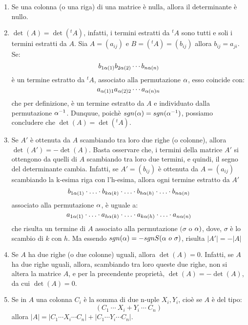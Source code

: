 \documentclass[../main.tex]{subfiles}
\begin{document}
\begin{enumerate}
    \item Se una colonna (o una riga) di una matrice è nulla, allora il determinante è
          nullo.
    \item $\det(A) = \det({^{t}A})$, infatti, i termini estratti da ${^{t}A}$ sono tutti e soli i termini estratti da $A$. Sia $A= (a_{ij})$ e $B = ({^{t}A}) = (b_{ij})$ allora $b_{ij} = a_{ji}$. Se:
          \[
              b_{1\alpha(1)}b_{2\alpha(2)}\cdots b_{n\alpha(n)}
          \]
          è un termine estratto da ${^{t}A}$, associato alla permutazione $\alpha$, esso coincide con:
          \[
              a_{\alpha(1)1}a_{\alpha(2)2}\cdots a_{\alpha(n)n}
          \]
          che per definizione, è un termine estratto da $A$ e individuato dalla
          permutazione $\alpha^{-1}$. Dunquue, poichè $sgn (\alpha) = sgn (\alpha^{-1})$, possiamo
          concludere che $\det(A) = \det({^{t}A})$.
    \item Se $A'$ è ottenuta da $A$ scambiando tra loro due righe (o colonne), allora
          $\det(A') = -\det(A)$. Basta osservare che, i termini della matrice $A'$ si
          ottengono da quelli di $A$ scambiando tra loro due termini, e quindi, il segno
          del determinante cambia. Infatti, se $A'=(b_{ij})$ è ottenuta da $A= (a_{ij})$
          scambiando la k-esima riga con l'h-esima, allora ogni termine estratto da $A'$
          \[
              b_{1\alpha(1)}\cdot\ldots\cdot b_{k\alpha(k)}\cdot\ldots\cdot b_{h\alpha(h)}\cdot\ldots\cdot b_{n\alpha(n)}
          \]
          associato alla permutazione $\alpha$, è uguale a:
          \[
              a_{1\alpha(1)}\cdot\ldots\cdot a_{h\alpha(k)}\cdot\ldots\cdot a_{k\alpha(h)}\cdot\ldots\cdot a_{n\alpha(n)}
          \]
          che risulta un termine di $A$ associato alla permutazione $(\sigma$ o $\alpha)$,
          dove, $\sigma$ è lo scambio di $k$ con $h$. Ma essendo $sgn(\alpha)=-sgn S (\alpha\ o
              \ \sigma)$, risulta $|A'| = -|A|$
    \item Se $A$ ha due righe (o due colonne) uguali, allora $\det(A) = 0$. Infatti, se
          $A$ ha due righe uguali, allora, scambiando tra loro queste due righe, non si
          altera la matrice $A$, e per la precendente proprietà, $\det(A) = -\det(A)$, da
          cui $\det(A) = 0$.
    \item Se in $A$ una colonna $C_i$ è la somma di due n-uple $X_i, Y_i$, cioè se $A$ è
          del tipo:
          \[
              (C_1\ \cdots\ X_i + Y_i\ \cdots\ C_n)
          \]
          allora $|A|=|C_1 \cdots X_i \cdots C_n|+|C_1\cdots Y_i\cdots C_n|$.

\end{enumerate}
\end{document}

